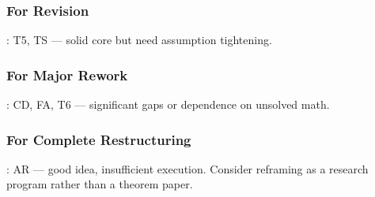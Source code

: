 \documentclass[
  12pt,
]{article}
\begin{document}
\subsubsection{For Revision}: T5, TS --- solid core but need assumption tightening.

\subsubsection{For Major Rework}: CD, FA, T6 --- significant gaps or dependence on unsolved math.

\subsubsection{For Complete Restructuring}: AR --- good idea, insufficient execution. Consider reframing as a research program rather than a theorem paper.
\end{document}
